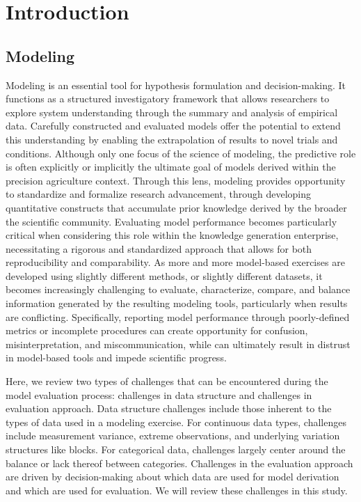 \section{Introduction}

\subsection{Modeling}

Modeling is an essential tool for hypothesis formulation and decision-making. It functions as a structured investigatory framework that allows researchers to explore system understanding through the summary and analysis of empirical data. Carefully constructed and evaluated models offer the potential to extend this understanding by enabling the extrapolation of results to novel trials and conditions. Although only one focus of the science of modeling, the predictive role is often explicitly or implicitly the ultimate goal of models derived within the precision agriculture context. Through this lens, modeling provides opportunity to standardize and formalize research advancement, through developing quantitative constructs that accumulate prior knowledge derived by the broader the scientific community. Evaluating model performance becomes particularly critical when considering this role within the knowledge generation enterprise, necessitating a rigorous and standardized approach that allows for both reproducibility and comparability. As more and more model-based exercises are developed using slightly different methods, or slightly different datasets, it becomes increasingly challenging to evaluate, characterize, compare, and balance information generated by the resulting modeling tools, particularly when results are conflicting. Specifically, reporting model performance through poorly-defined metrics or incomplete procedures can create opportunity for confusion, misinterpretation, and miscommunication, while can ultimately result in distrust in model-based tools and impede scientific progress.

Here, we review two types of challenges that can be encountered during the model evaluation process: challenges in data structure and challenges in evaluation approach. Data structure challenges include those inherent to the types of data used in a modeling exercise. For continuous data types, challenges include measurement variance, extreme observations, and underlying variation structures like blocks. For categorical data, challenges largely center around the balance or lack thereof between categories.  Challenges in the evaluation approach are driven by decision-making about which data are used for model derivation and which are used for evaluation. We will review these challenges in this study.

